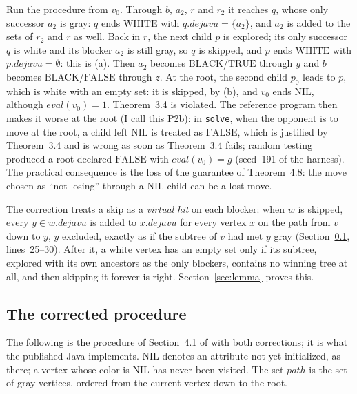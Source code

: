 \documentclass{article}
\theoremstyle{plain}
\theoremstyle{definition}
\theoremstyle{remark}
\newcommand{\eval}{\mathit{eval}}
\newcommand{\dejv}{\mathit{dejavu}}
\newcommand{\TRUE}{\ensuremath{\mathrm{TRUE}}}
\newcommand{\FALSE}{\ensuremath{\mathrm{FALSE}}}
\newcommand{\NIL}{\ensuremath{\mathrm{NIL}}}
\newcommand{\WHITE}{\ensuremath{\mathrm{WHITE}}}
\newcommand{\BLACK}{\ensuremath{\mathrm{BLACK}}}
\newcommand{\code}[1]{\texttt{#1}}
\begin{document}
Run the procedure from $v_0$. Through $b$, $a_2$, $r$ and $r_2$ it reaches $q$, whose only successor $a_2$ is gray: $q$ ends \WHITE{} with $q.\dejv = \{a_2\}$, and $a_2$ is added to the sets of $r_2$ and $r$ as well. Back in $r$, the next child $p$ is explored; its only successor $q$ is white and its blocker $a_2$ is still gray, so $q$ is skipped, and $p$ ends \WHITE{} with $p.\dejv = \emptyset$: this is (a). Then $a_2$ becomes \BLACK{}/\TRUE{} through $y$ and $b$ becomes \BLACK{}/\FALSE{} through $z$. At the root, the second child $p_0$ leads to $p$, which is white with an empty set: it is skipped, by (b), and $v_0$ ends \NIL{}, although $\eval(v_0) = 1$. Theorem~3.4 is violated. The reference program then makes it worse at the root (I call this P2b): in \code{solve}, when the opponent is to move at the root, a child left \NIL{} is treated as \FALSE{}, which is justified by Theorem~3.4 and is wrong as soon as Theorem~3.4 fails; random testing produced a root declared \FALSE{} with $\eval(v_0) = g$ (seed~191 of the harness). The practical consequence is the loss of the guarantee of Theorem~4.8: the move chosen as ``not losing'' through a NIL child can be a lost move.

The correction treats a skip as a \emph{virtual hit} on each blocker: when $w$ is skipped, every $y \in w.\dejv$ is added to $x.\dejv$ for every vertex $x$ on the path from $v$ down to $y$, $y$ excluded, exactly as if the subtree of $v$ had met $y$ gray (Section~\ref{sec:corrected}, lines~25--30). After it, a white vertex has an empty set only if its subtree, explored with its own ancestors as the only blockers, contains no winning tree at all, and then skipping it forever is right. Section~\ref{sec:lemma} proves this.

\subsection{The corrected procedure}\label{sec:corrected}

The following is the procedure of Section~4.1 of \cite{romano2026} with both corrections; it is what the published Java implements. \NIL{} denotes an attribute not yet initialized, as there; a vertex whose color is \NIL{} has never been visited. The set $\mathit{path}$ is the set of gray vertices, ordered from the current vertex down to the root.
\end{document}
